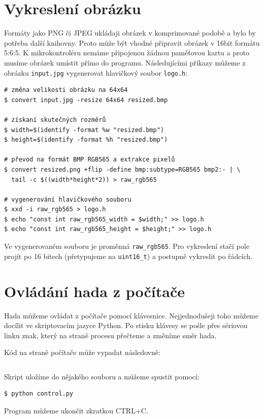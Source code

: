\documentclass[12pt]{article}
\begin{document}
\section{Vykreslení obrázku}
Formáty jako PNG či JPEG ukládaji obrázek v komprimované podobě a bylo by potřeba další knihovny.
Proto může být vhodné připravit obrázek v 16bit formátu 5:6:5.
K mikrokontroléru nemáme připojenou žádnou paměťovou kartu a proto musíme obrázek umístit přímo do programu.
Následujícími příkazy můžeme z obrázku \texttt{input.jpg} vygenerovat hlavičkový soubor \texttt{logo.h}:
\begin{verbatim}
# změna velikosti obrázku na 64x64
$ convert input.jpg -resize 64x64 resized.bmp

# získaní skutečných rozměrů
$ width=$(identify -format %w "resized.bmp")
$ height=$(identify -format %h "resized.bmp")

# převod na formát BMP RGB565 a extrakce pixelů
$ convert resized.png +flip -define bmp:subtype=RGB565 bmp2:- | \
  tail -c $((width*height*2)) > raw_rgb565

# vygenerování hlavičkového souboru
$ xxd -i raw_rgb565 > logo.h 
$ echo "const int raw_rgb565_width = $width;" >> logo.h
$ echo "const int raw_rgb565_height = $height;" >> logo.h
\end{verbatim}

Ve vygenerovaném souboru je proměnná \texttt{raw\_rgb565}.
Pro vykreslení stačí pole projít po 16 bitech (přetypujeme na \texttt{uint16_t}) a postupně vykreslit po řádcích.

\section{Ovládání hada z počítače}
Hada můžeme ovládat z počítače pomocí klávesnice.
Nejjednodušeji toho můžeme docílit ve skriptovacím jazyce Python.
Po stisku klávesy se pošle přes sériovou linku znak, který na straně procesu přečteme a změníme směr hada.

\noindent
\begin{minipage}{\linewidth}
Kód na straně počítače může vypadat následovně:
\inputminted{python}{control.py}
  \vspace{0.3cm}
\end{minipage}
Skript uložíme do nějakého souboru a můžeme spustit pomocí:
\begin{verbatim}
$ python control.py
\end{verbatim}
Program můžeme ukončit zkratkou \textsc{CTRL+C}.
\end{document}
